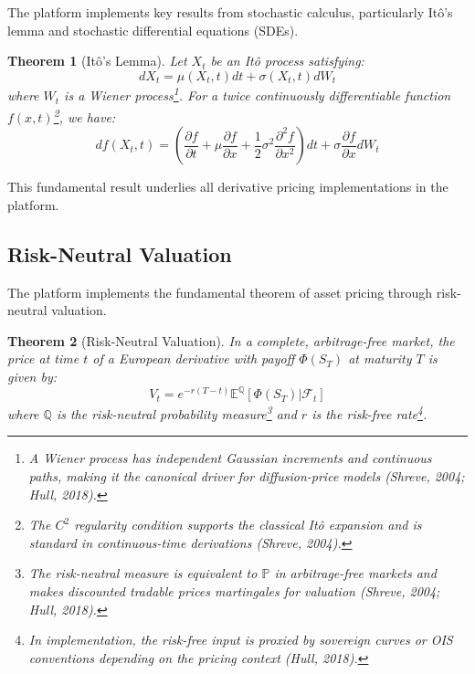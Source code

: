 \documentclass[12pt,a4paper]{article}
\newtheorem{theorem}{Theorem}[section]
\theoremstyle{definition}
\theoremstyle{remark}
\begin{document}
The platform implements key results from stochastic calculus, particularly Itô's lemma and stochastic differential equations (SDEs).

\begin{theorem}[Itô's Lemma]
Let $X_t$ be an Itô process satisfying:
\begin{equation}
dX_t = \mu(X_t, t) dt + \sigma(X_t, t) dW_t
\end{equation}
where $W_t$ is a Wiener process\footnote{A Wiener process has independent Gaussian increments and continuous paths, making it the canonical driver for diffusion-price models (Shreve, 2004; Hull, 2018).}. For a twice continuously differentiable function $f(x,t)$\footnote{The $C^2$ regularity condition supports the classical Itô expansion and is standard in continuous-time derivations (Shreve, 2004).}, we have:
\begin{equation}
df(X_t, t) = \left(\frac{\partial f}{\partial t} + \mu \frac{\partial f}{\partial x} + \frac{1}{2}\sigma^2 \frac{\partial^2 f}{\partial x^2}\right) dt + \sigma \frac{\partial f}{\partial x} dW_t
\end{equation}
\end{theorem}

This fundamental result underlies all derivative pricing implementations in the platform.

\subsection{Risk-Neutral Valuation}

The platform implements the fundamental theorem of asset pricing through risk-neutral valuation.

\begin{theorem}[Risk-Neutral Valuation]
In a complete, arbitrage-free market, the price at time $t$ of a European derivative with payoff $\Phi(S_T)$ at maturity $T$ is given by:
\begin{equation}
V_t = e^{-r(T-t)} \mathbb{E}^{\mathbb{Q}}[\Phi(S_T) | \mathcal{F}_t]
\end{equation}
where $\mathbb{Q}$ is the risk-neutral probability measure\footnote{The risk-neutral measure is equivalent to $\mathbb{P}$ in arbitrage-free markets and makes discounted tradable prices martingales for valuation (Shreve, 2004; Hull, 2018).} and $r$ is the risk-free rate\footnote{In implementation, the risk-free input is proxied by sovereign curves or OIS conventions depending on the pricing context (Hull, 2018).}.
\end{theorem}
\end{document}
